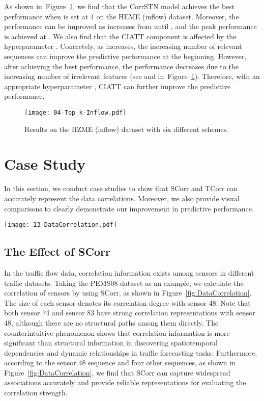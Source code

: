 \documentclass[sn-mathphys,iicol]{sn-jnl}
\newcommand\figref[1]{Figure~\ref{#1}}
\theoremstyle{thmstyleone}\newtheorem{theorem}{Theorem}\newtheorem{proposition}[theorem]{Proposition}
\theoremstyle{thmstyletwo}\newtheorem{example}{Example}\newtheorem{remark}{Remark}
\theoremstyle{thmstylethree}\newtheorem{definition}{Definition}
\begin{document}
As shown in~\figref{fig:different-topk}, we find that the CorrSTN model achieves the best performance when  is set at 4 on the HEME (inflow) dataset. Moreover, the performance can be improved as  increases from  until , and the peak performance is achieved at . We also find that the CIATT component is affected by the hyperparameter . Concretely, as  increases, the increasing number of relevant sequences can improve the predictive performance at the beginning. However, after achieving the best performance, the performance decreases due to the increasing number of irrelevant features (see  and  in~\figref{fig:different-topk}). Therefore, with an appropriate hyperparameter , CIATT can further improve the predictive performance.







\begin{figure}[h]
\centering
\texttt{[image: 04-Top\_k-Inflow.pdf]}
\caption{Results on the HZME (inflow) dataset with six different  schemes.}
\label{fig:different-topk}
\end{figure}

\section{Case Study}
In this section, we conduct case studies to show that SCorr and TCorr can accurately represent the data correlations. Moreover, we also provide visual comparisons to clearly demonstrate our improvement in predictive performance.





\begin{figure*}[t]
\centering
\texttt{[image: 13-DataCorrelation.pdf]}
\caption{The spatial correlation information between sensor  and other sensors on the PEMS08 dataset.}
\label{fig:DataCorrelation}
\end{figure*}

\subsection{The Effect of SCorr}
In the traffic flow data, correlation information exists among sensors in different traffic datasets. Taking the PEMS08 dataset as an example, we calculate the correlation of sensors by using SCorr, as shown in \figref{fig:DataCorrelation}. The size of each sensor denotes its correlation degree with sensor 48. Note that both sensor 74 and sensor 83 have strong correlation representations with sensor 48, although there are no structural paths among them directly. The counterintuitive phenomenon shows that correlation information is more significant than structural information in discovering spatiotemporal dependencies and dynamic relationships in traffic forecasting tasks. Furthermore, according to the sensor 48 sequence and four other sequences, as shown in \figref{fig:DataCorrelation}, we find that SCorr can capture widespread associations accurately and provide reliable representations for evaluating the correlation strength.
\end{document}
